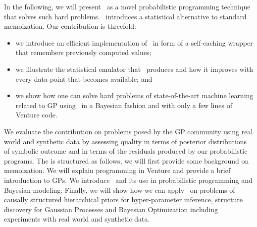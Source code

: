 In the following, we will present \gpmem\ as a novel probabilistic programming technique that solves such hard problems. \gpmem\ introduces a statistical alternative to standard memoization.  Our contribution is threefold: 
\begin{itemize}
\item we introduce an efficient implementation of \gpmem\ in form of a self-caching wrapper  that remembers previously computed values;
\item we illustrate the statistical emulator that \gpmem\ produces and how it improves with every data-point that becomes available; and
 \item  we show how one can solve hard problems  of state-of-the-art machine learning related to GP  using \gpmem\ in a Bayesian fashion and with only a few lines of Venture code.
\end{itemize}

We evaluate the contribution on problems posed by the GP community using real world and synthetic data by assessing quality in terms of posterior distributions of symbolic outcome and in terms of the residuals produced by our probabilistic programs. 
The \paperOrChapter is structured as follows, we will first provide some background on memoization. We will explain programming in Venture and provide a brief introduction to GPs. We introduce \gpmem\ and its use in probabilistic programming and Bayesian modeling. Finally, we will show how we can apply \gpmem\ on problems of causally structured hierarchical priors for hyper-parameter inference, structure discovery for Gaussian Processes and Bayesian Optimization including experiments with real world and synthetic data.


